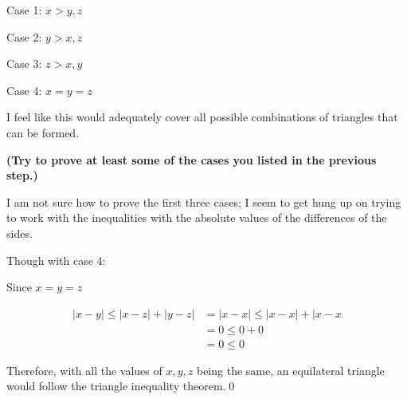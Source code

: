\documentclass[11pt]{article}
\renewcommand\part[1]{\vspace{.10in}\textbf{(#1)}\par}
\begin{document}
Case 1: $x > y, z$

Case 2: $y > x, z$

Case 3: $z > x, y$

Case 4: $x = y = z$

I feel like this would adequately cover all possible combinations of triangles that can be formed.

\part{Try to prove at least some of the cases you listed in the previous step.}

I am not sure how to prove the first three cases; I seem to get hung up on trying to work with the inequalities with the absolute values of the differences of the sides.

Though with case 4:

Since $x = y = z$

\begin{align*}
	|x-y| \le |x-z| + |y-z| &= |x-x| \le |x-x| + |x-x\\
	&= 0 \le 0 + 0\\
	&= 0 \le 0
\end{align*}

Therefore, with all the values of $x, y, z$ being the same, an equilateral triangle would follow the triangle inequality theorem.\qed

	
\end{document}
